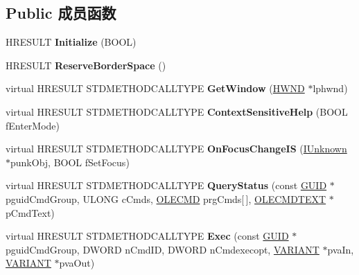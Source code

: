 \subsection*{Public 成员函数}
\begin{DoxyCompactItemize}
\item 
\mbox{\label{class_c_base_bar_a8db7d12fdfe7a6f66f763bcfa7469ce0}} 
H\+R\+E\+S\+U\+LT {\bfseries Initialize} (B\+O\+OL)
\item 
\mbox{\label{class_c_base_bar_aeea4e171632e1d5974508dddef28a2fd}} 
H\+R\+E\+S\+U\+LT {\bfseries Reserve\+Border\+Space} ()
\item 
\mbox{\label{class_c_base_bar_a55513aa44e92505ed2664b4170615b42}} 
virtual H\+R\+E\+S\+U\+LT S\+T\+D\+M\+E\+T\+H\+O\+D\+C\+A\+L\+L\+T\+Y\+PE {\bfseries Get\+Window} (\hyperlink{interfacevoid}{H\+W\+ND} $\ast$lphwnd)
\item 
\mbox{\label{class_c_base_bar_af7e783b6e867ad4531406e4694208bd9}} 
virtual H\+R\+E\+S\+U\+LT S\+T\+D\+M\+E\+T\+H\+O\+D\+C\+A\+L\+L\+T\+Y\+PE {\bfseries Context\+Sensitive\+Help} (B\+O\+OL f\+Enter\+Mode)
\item 
\mbox{\label{class_c_base_bar_ae8a6ada76d84842206ab9f49c0e3601c}} 
virtual H\+R\+E\+S\+U\+LT S\+T\+D\+M\+E\+T\+H\+O\+D\+C\+A\+L\+L\+T\+Y\+PE {\bfseries On\+Focus\+Change\+IS} (\hyperlink{interface_i_unknown}{I\+Unknown} $\ast$punk\+Obj, B\+O\+OL f\+Set\+Focus)
\item 
\mbox{\label{class_c_base_bar_a4dfe53c028a8f23ab6bd85acf21cc219}} 
virtual H\+R\+E\+S\+U\+LT S\+T\+D\+M\+E\+T\+H\+O\+D\+C\+A\+L\+L\+T\+Y\+PE {\bfseries Query\+Status} (const \hyperlink{interface_g_u_i_d}{G\+U\+ID} $\ast$pguid\+Cmd\+Group, U\+L\+O\+NG c\+Cmds, \hyperlink{struct_i_ole_command_target_1_1__tag_o_l_e_c_m_d}{O\+L\+E\+C\+MD} prg\+Cmds\mbox{[}$\,$\mbox{]}, \hyperlink{struct_i_ole_command_target_1_1__tag_o_l_e_c_m_d_t_e_x_t}{O\+L\+E\+C\+M\+D\+T\+E\+XT} $\ast$p\+Cmd\+Text)
\item 
\mbox{\label{class_c_base_bar_aba3c94a3e8cb50f5e97e802105e6547b}} 
virtual H\+R\+E\+S\+U\+LT S\+T\+D\+M\+E\+T\+H\+O\+D\+C\+A\+L\+L\+T\+Y\+PE {\bfseries Exec} (const \hyperlink{interface_g_u_i_d}{G\+U\+ID} $\ast$pguid\+Cmd\+Group, D\+W\+O\+RD n\+Cmd\+ID, D\+W\+O\+RD n\+Cmdexecopt, \hyperlink{structtag_v_a_r_i_a_n_t}{V\+A\+R\+I\+A\+NT} $\ast$pva\+In, \hyperlink{structtag_v_a_r_i_a_n_t}{V\+A\+R\+I\+A\+NT} $\ast$pva\+Out)

\end{DoxyCompactItemize}
